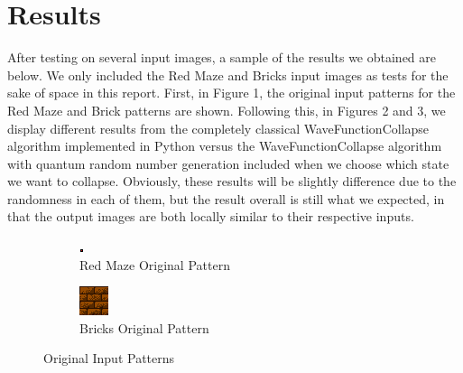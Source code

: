 \documentclass[10pt]{article}
\begin{document}
\section{Results}
After testing on several input images, a sample of the results we obtained are below. We only included the Red Maze and Bricks input images as tests for the sake of space in this report. First, in Figure 1, the original input patterns for the Red Maze and Brick patterns are shown. Following this, in Figures 2 and 3, we display different results from the completely classical WaveFunctionCollapse algorithm implemented in Python versus the WaveFunctionCollapse algorithm with quantum random number generation included when we choose which state we want to collapse. Obviously, these results will be slightly difference due to the randomness in each of them, but the result overall is still what we expected, in that the output images are both locally similar to their respective inputs. 
\newpage
\begin{figure}[h]
\centering
\begin{subfigure}{.5\textwidth}
  \centering
  \includegraphics[scale=5]{RedMaze}
  \caption{Red Maze Original Pattern}
\end{subfigure}%
\begin{subfigure}{.5\textwidth}
  \centering
  \includegraphics[scale=1]{3Bricks}
  \caption{Bricks Original Pattern}
\end{subfigure}
\caption{Original Input Patterns}
\label{fig:test}
\end{figure}
\end{document}
